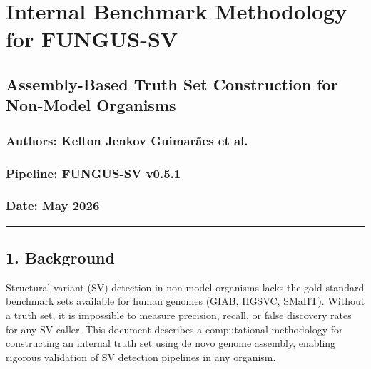 \documentclass[
]{article}
\author{}
\date{}
\begin{document}
\hypertarget{internal-benchmark-methodology-for-fungus-sv}{%
\section{Internal Benchmark Methodology for
FUNGUS-SV}\label{internal-benchmark-methodology-for-fungus-sv}}

\hypertarget{assembly-based-truth-set-construction-for-non-model-organisms}{%
\subsection{Assembly-Based Truth Set Construction for Non-Model
Organisms}\label{assembly-based-truth-set-construction-for-non-model-organisms}}

\hypertarget{authors-kelton-jenkov-guimaruxe3es-et-al.}{%
\subsubsection{Authors: Kelton Jenkov Guimarães et
al.}\label{authors-kelton-jenkov-guimaruxe3es-et-al.}}

\hypertarget{pipeline-fungus-sv-v0.5.1}{%
\subsubsection{Pipeline: FUNGUS-SV
v0.5.1}\label{pipeline-fungus-sv-v0.5.1}}

\hypertarget{date-may-2026}{%
\subsubsection{Date: May 2026}\label{date-may-2026}}

\begin{center}\rule{0.5\linewidth}{0.5pt}\end{center}

\hypertarget{background}{%
\subsection{1. Background}\label{background}}

Structural variant (SV) detection in non-model organisms lacks the
gold-standard benchmark sets available for human genomes (GIAB, HGSVC,
SMaHT). Without a truth set, it is impossible to measure precision,
recall, or false discovery rates for any SV caller. This document
describes a computational methodology for constructing an internal truth
set using de novo genome assembly, enabling rigorous validation of SV
detection pipelines in any organism.
\end{document}
